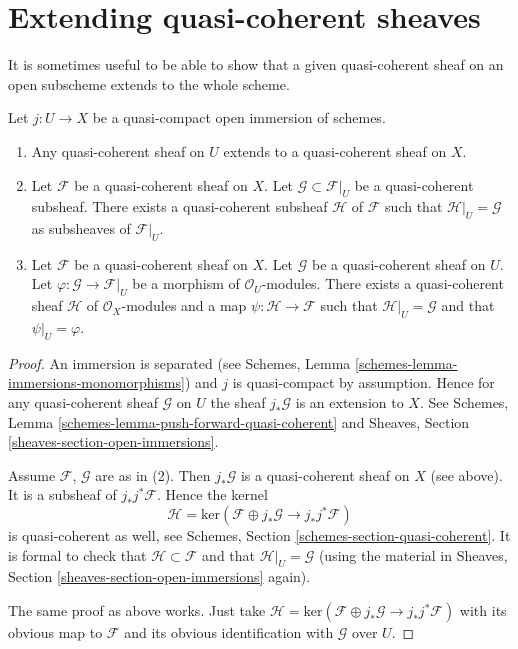 \section{Extending quasi-coherent sheaves}
\label{section-extending-quasi-coherent-sheaves}

\noindent
It is sometimes useful to be able to show that a given quasi-coherent
sheaf on an open subscheme extends to the whole scheme.

\begin{lemma}
\label{lemma-extend-trivial}
Let $j : U \to X$ be a quasi-compact open immersion of schemes.
\begin{enumerate}
\item Any quasi-coherent sheaf on $U$ extends to a quasi-coherent
sheaf on $X$.
\item Let $\mathcal{F}$ be a quasi-coherent sheaf on $X$.
Let $\mathcal{G} \subset \mathcal{F}|_U$ be a quasi-coherent
subsheaf. There exists a quasi-coherent subsheaf $\mathcal{H}$ of
$\mathcal{F}$ such that $\mathcal{H}|_U = \mathcal{G}$
as subsheaves of $\mathcal{F}|_U$.
\item Let $\mathcal{F}$ be a quasi-coherent sheaf on $X$.
Let $\mathcal{G}$ be a quasi-coherent sheaf on $U$.
Let $\varphi : \mathcal{G} \to \mathcal{F}|_U$ be a morphism
of $\mathcal{O}_U$-modules. There exists a quasi-coherent sheaf $\mathcal{H}$
of $\mathcal{O}_X$-modules and a map $\psi : \mathcal{H} \to \mathcal{F}$
such that $\mathcal{H}|_U = \mathcal{G}$ and that
$\psi|_U = \varphi$.
\end{enumerate}
\end{lemma}

\begin{proof}
An immersion is separated
(see Schemes, Lemma \ref{schemes-lemma-immersions-monomorphisms})
and $j$ is quasi-compact by assumption.
Hence for any quasi-coherent sheaf $\mathcal{G}$ on $U$ the sheaf
$j_*\mathcal{G}$ is an extension to $X$. See
Schemes, Lemma \ref{schemes-lemma-push-forward-quasi-coherent} and
Sheaves, Section \ref{sheaves-section-open-immersions}.

\medskip\noindent
Assume $\mathcal{F}$, $\mathcal{G}$ are as in (2).
Then $j_*\mathcal{G}$ is a quasi-coherent sheaf on $X$ (see above).
It is a subsheaf of $j_*j^*\mathcal{F}$.
Hence the kernel
$$
\mathcal{H} =
\text{ker}(\mathcal{F} \oplus j_* \mathcal{G}
\longrightarrow j_*j^*\mathcal{F})
$$
is quasi-coherent as well, see
Schemes, Section \ref{schemes-section-quasi-coherent}.
It is formal to check that $\mathcal{H} \subset \mathcal{F}$ and that
$\mathcal{H}|_U = \mathcal{G}$ (using the material in
Sheaves, Section \ref{sheaves-section-open-immersions} again).

\medskip\noindent
The same proof as above works. Just take
$\mathcal{H} = \text{ker}(\mathcal{F} \oplus j_* \mathcal{G}
\to j_*j^*\mathcal{F})$ with its obvious map to $\mathcal{F}$
and its obvious identification with $\mathcal{G}$ over $U$.
\end{proof}

